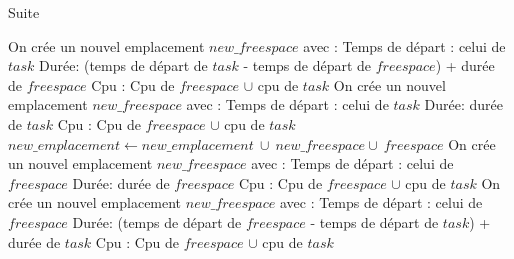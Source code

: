 \documentclass{report}
\begin{document}
\begin{algorithm}[h]
\caption{Suite}
\begin{algorithmic}[1]
				\State On crée un nouvel emplacement $new\_freespace$ avec :
					\State \hspace{\algorithmicindent} Temps de départ : celui de $task$
					\State \hspace{\algorithmicindent} Durée: (temps de départ de $task$ - temps de départ de $freespace$) + durée de $freespace$
					\State \hspace{\algorithmicindent} Cpu : Cpu de $freespace$ $\cup$ cpu de $task$
			\Else
				\State On crée un nouvel emplacement $new\_freespace$ avec :
					\State \hspace{\algorithmicindent} Temps de départ : celui de $task$
					\State \hspace{\algorithmicindent} Durée: durée de $task$
					\State \hspace{\algorithmicindent} Cpu : Cpu de $freespace$ $\cup$ cpu de $task$
			\EndIf
			\State $new\_emplacement \gets new\_emplacement\ \cup\ new\_freespace \cup\ freespace$
				\State On crée un nouvel emplacement $new\_freespace$ avec :
					\State \hspace{\algorithmicindent} Temps de départ : celui de $freespace$
					\State \hspace{\algorithmicindent} Durée: durée de $freespace$
					\State \hspace{\algorithmicindent} Cpu : Cpu de $freespace$ $\cup$ cpu de $task$
			\Else
				\State On crée un nouvel emplacement $new\_freespace$ avec :
					\State \hspace{\algorithmicindent} Temps de départ : celui de $freespace$
					\State \hspace{\algorithmicindent} Durée: (temps de départ de $freespace$ - temps de départ de $task$) + durée de $task$
					\State \hspace{\algorithmicindent} Cpu : Cpu de $freespace$ $\cup$ cpu de $task$

\end{algorithmic}
\end{algorithm}
\end{document}
